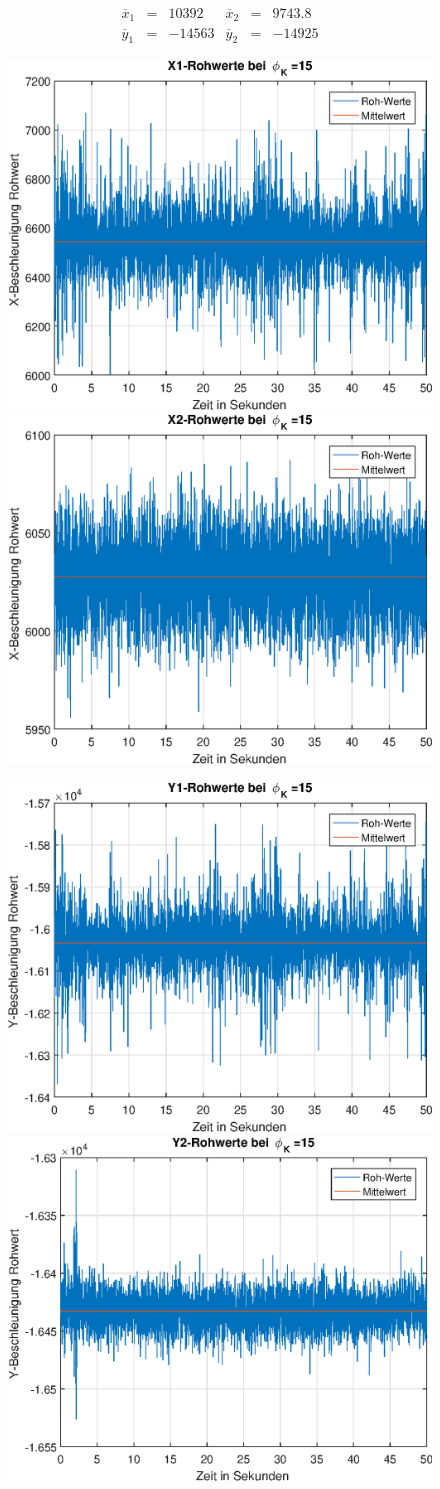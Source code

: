 \documentclass{article}
\begin{document}
\begin{equation}
\begin{array}{lclclcl}
\overline{x}_1 &=& 10392 & \overline{x}_2 &=& 9743.8 \\
\overline{y}_1 &=& -14563 & \overline{y}_2 &=& -14925
\end{array}
\end{equation}
\newpage
\begin{figure}[h]
	\includegraphics[width=0.5\linewidth]{img/phiK15_x1_raw.eps}
	\includegraphics[width=0.5\linewidth]{img/phiK15_x2_raw.eps}
\end{figure}
\begin{figure}[h]
	\includegraphics[width=0.5\linewidth]{img/phiK15_y1_raw.eps}
	\includegraphics[width=0.5\linewidth]{img/phiK15_y2_raw.eps}
\end{figure}
\end{document}
